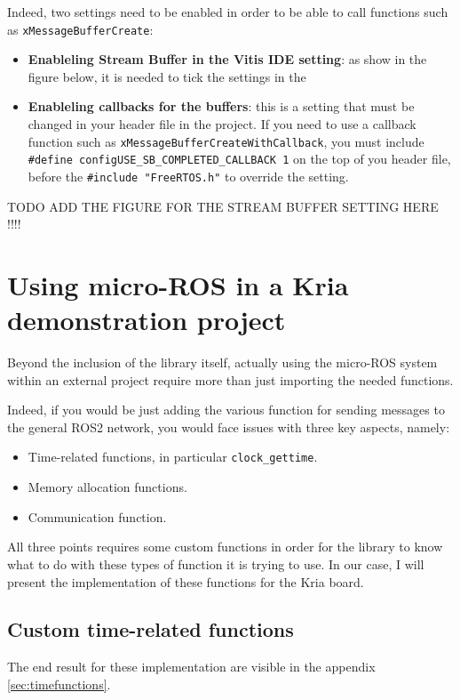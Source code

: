 \documentclass[10pt]{article}
\begin{document}
Indeed, two settings need to be enabled in order to be able to call
functions such as \verb|xMessageBufferCreate|:

\begin{itemize}
\item \textbf{Enableling Stream Buffer in the Vitis IDE setting}: as show in the
  figure below, it is needed to tick the settings in the 
\item \textbf{Enableling callbacks for the buffers}: this is a setting that must
  be changed in your header file in the project. If you need to use a callback
  function such as \verb|xMessageBufferCreateWithCallback|, you must include
  \verb|#define configUSE_SB_COMPLETED_CALLBACK 1| on the top of you header
  file, before the \verb|#include "FreeRTOS.h"| to override the setting.
\end{itemize}

TODO ADD THE FIGURE FOR THE STREAM BUFFER SETTING HERE !!!!

\section{Using micro-ROS in a Kria demonstration project}
Beyond the inclusion of the library itself, actually using the micro-ROS system
within an external project require more than just importing the needed
functions.

Indeed, if you would be just adding the various function for sending messages to
the general ROS2 network, you would face issues with three key aspects, namely:
\begin{itemize}
\item Time-related functions, in particular \verb|clock_gettime|.
\item Memory allocation functions.
\item Communication function.
\end{itemize}

All three points requires some custom functions in order for the library to
know what to do with these types of function it is trying to use.
In our case, I will present the implementation of these functions for the
Kria board.

\subsection{Custom time-related functions}
The end result for these implementation are visible in the appendix
\ref{sec:timefunctions}.
\end{document}
